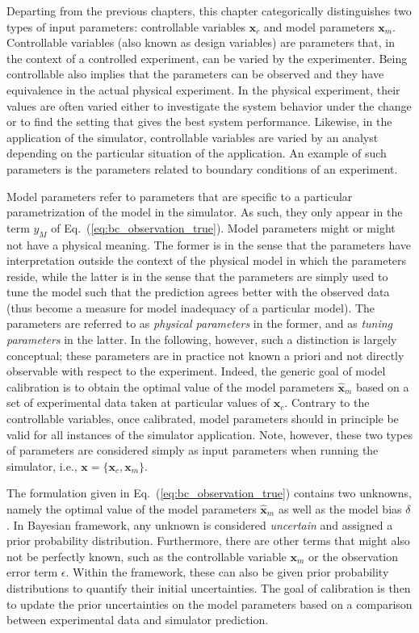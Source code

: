 Departing from the previous chapters, this chapter categorically distinguishes two types of input parameters: controllable variables $\bm{x}_c$ and model parameters $\bm{x}_m$.
Controllable variables (also known as design variables) are parameters that, in the context of a controlled experiment, can be varied by the experimenter.
Being controllable also implies that the parameters can be observed and they have equivalence in the actual physical experiment.
In the physical experiment, their values are often varied either to investigate the system behavior under the change or to find the setting that gives the best system performance.
Likewise, in the application of the simulator, controllable variables are varied by an analyst depending on the particular situation of the application.
An example of such parameters is the parameters related to boundary conditions of an experiment.

Model parameters refer to parameters that are specific to a particular parametrization of the model in the simulator.
As such, they only appear in the term $y_M$ of Eq.~(\ref{eq:bc_observation_true}).
Model parameters might or might not have a physical meaning.
The former is in the sense that the parameters have interpretation outside the context of the physical model in which the parameters reside, while the latter is in the sense that the parameters are simply used to tune the model such that the prediction agrees better with the observed data (thus become a measure for model inadequacy of a particular model).
The parameters are referred to as \emph{physical parameters} in the former,
and as \emph{tuning parameters} in the latter.
In the following, however, such a distinction is largely conceptual;
these parameters are in practice not known a priori and not directly observable with respect to the experiment.
Indeed, the generic goal of model calibration is to obtain the optimal value of the model parameters $\hat{\bm{x}}_m$ based on a set of experimental data taken at particular values of $\bm{x}_c$.
Contrary to the controllable variables, once calibrated, model parameters should in principle be valid for all instances of the simulator application.
Note, however, these two types of parameters are considered simply as input parameters when running the simulator, i.e., $\bm{x} = \{\bm{x}_c, \bm{x}_m\}$.

The formulation given in Eq.~(\ref{eq:bc_observation_true}) contains two unknowns, namely the optimal value of the model parameters $\hat{\bm{x}}_m$ as well as the model bias $\delta$.
In Bayesian framework, any unknown is considered \emph{uncertain} and assigned a prior probability distribution.
Furthermore, there are other terms that might also not be perfectly known, such as the controllable variable $\bm{x}_m$ or the observation error term $\epsilon$. 
Within the framework, these can also be given prior probability distributions to quantify their initial uncertainties.
The goal of calibration is then to update the prior uncertainties on the model parameters based on a comparison between experimental data and simulator prediction.



